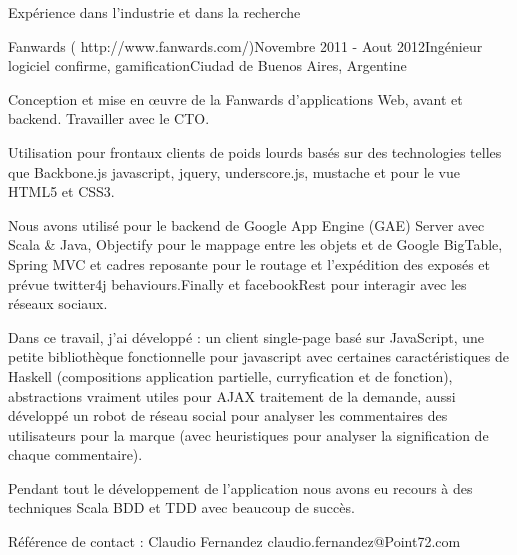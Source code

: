 \documentclass{resume} %
\begin{document}
\begin{rSection}{Exp\'{e}rience dans l'industrie et dans la recherche}

\begin{rSubsection}{Fanwards ( http://www.fanwards.com/)}{Novembre 2011 - Aout 2012}{Ing\'{e}nieur logiciel confirme, gamification}{Ciudad de Buenos Aires, Argentine}
	\item Conception et mise en \oe uvre de la Fanwards d'applications Web, avant et backend. Travailler avec le CTO.
	\item Utilisation pour frontaux clients de poids lourds bas\'{e}s sur des technologies telles que Backbone.js javascript, jquery, underscore.js, mustache et pour le vue HTML5 et CSS3.
	\item Nous avons utilis\'{e} pour le backend de Google App Engine (GAE) Server avec Scala \& Java, Objectify pour le mappage entre les objets et de Google BigTable, Spring MVC et cadres reposante pour le routage et l'exp\'{e}dition des expos\'{e}s et pr\'{e}vue twitter4j behaviours.Finally et facebookRest pour interagir avec les r\'{e}seaux sociaux.
	\item Dans ce travail, j'ai d\'{e}velopp\'{e} : un client single-page bas\'{e} sur JavaScript, une petite biblioth\`{e}que fonctionnelle pour javascript avec certaines caract\'{e}ristiques de Haskell (compositions application partielle, curryfication et de fonction), abstractions vraiment utiles pour AJAX traitement de la demande, aussi d\'{e}velopp\'{e} un robot de r\'{e}seau social pour analyser les commentaires des utilisateurs pour la marque (avec heuristiques pour analyser la signification de chaque commentaire).
	
	\item Pendant tout le d\'{e}veloppement de l'application nous avons eu recours \`{a} des techniques Scala BDD et TDD avec beaucoup de succ\`{e}s.
	
	\item R\'{e}f\'{e}rence de contact : Claudio Fernandez claudio.fernandez@Point72.com
\end{rSubsection}




\end{rSection}
\end{document}
